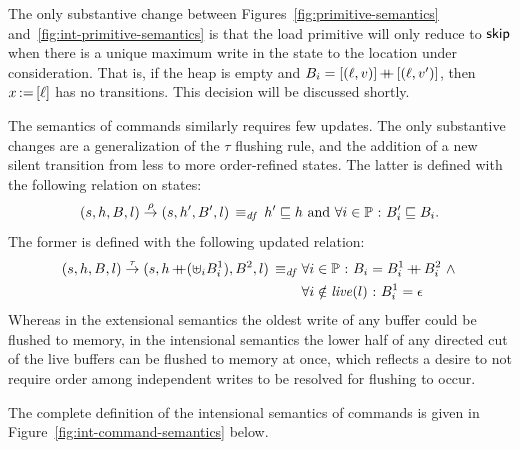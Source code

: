 \documentclass[11pt]{article}
\begin{document}
The only substantive change between Figures~\ref{fig:primitive-semantics} and~\ref{fig:int-primitive-semantics} is that the load primitive will only  reduce to $\operatorname{\mathsf{skip}}$ when there is a unique maximum write in the state to the location under consideration. That is, if the heap is empty and $B_i = \left[(\ell,v)\right] \operatorname{+\!\!\!+} \left[(\ell,v')\right]$, then $x \operatorname{:\!=} \left[ \ell \right]$ has no transitions. This decision will be discussed shortly. 

The semantics of commands similarly requires few updates. The only substantive changes are a generalization of the $\tau$ flushing rule, and the addition of a new silent transition from less to more order-refined states. The latter is defined with the following relation on states: \[ (s,h,B,l) \stackrel{\rho}{\rightarrow} (s,h',B',l) \operatorname{\;\equiv_{\mathit{df}}\;} h' \sqsubseteq h \text{ and } \forall i \in \mathbb{P} \operatorname{\,:\,} B'_i \sqsubseteq B_i.\] The former is defined with the following updated relation: \begin{align*} (s,h,B,l) \stackrel{\tau}{\rightarrow} (s,h\operatorname{+\!\!\!+} (\uplus_i B^1_i),B^2,l) \operatorname{\;\equiv_{\mathit{df}}\;} & \forall i \in \mathbb{P} \operatorname{\,:\,} B_i = B^1_i \operatorname{+\!\!\!+} B^2_i \operatorname{\,\wedge\,} \\ & \forall i \notin \mathit{live}(l) \operatorname{\,:\,} B^1_i = \epsilon\end{align*} Whereas in the extensional semantics the oldest write of any buffer could be flushed to memory, in the intensional semantics the lower half of any directed cut of the live buffers can be flushed to memory at once, which reflects a desire to not require order among independent writes to be resolved for flushing to occur. 

The complete definition of the intensional semantics of commands is given in Figure~\ref{fig:int-command-semantics} below. 
\end{document}
